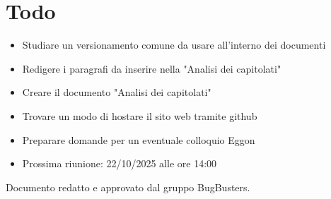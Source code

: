 \documentclass[a4paper,12pt]{article}
\begin{document}
\section{Todo}

\begin{tcolorbox}[colback=secondaryblue!8,colframe=secondaryblue!60,arc=2mm,boxrule=0.5pt,left=10pt,right=10pt]
\begin{itemize}[topsep=5pt]
    \item Studiare un versionamento comune da usare all'interno dei documenti
    \item Redigere i paragrafi da inserire nella "Analisi dei capitolati" 
    \item Creare il documento "Analisi dei capitolati"
    \item Trovare un modo di hostare il sito web tramite github
    \item Preparare domande per un eventuale colloquio Eggon
    \item Prossima riunione: 22/10/2025 alle ore 14:00
\end{itemize}
\end{tcolorbox}

\vfill
\begin{center}
    {\small\color{darkgray} Documento redatto e approvato dal gruppo BugBusters.}
\end{center}
\end{document}
